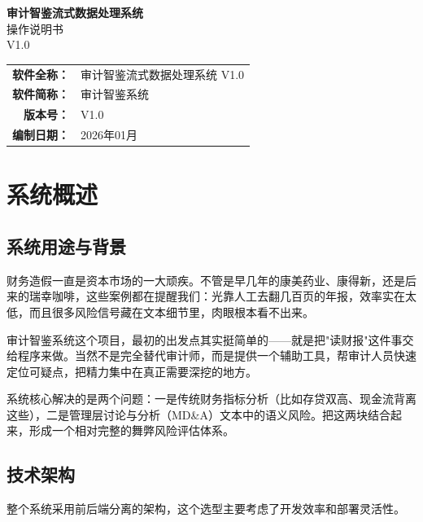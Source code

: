 \documentclass[12pt,a4paper]{ctexart}
\begin{document}
\begin{titlepage}
\centering
\vspace*{3cm}
{\Huge\heiti\bfseries 审计智鉴流式数据处理系统}\\[0.8cm]
{\LARGE\heiti 操作说明书}\\[0.5cm]
{\Large V1.0}\\[3cm]
\begin{tabular}{rl}
\textbf{软件全称：} & 审计智鉴流式数据处理系统 V1.0 \\[0.3em]
\textbf{软件简称：} & 审计智鉴系统 \\[0.3em]
\textbf{版本号：} & V1.0 \\[0.3em]
\textbf{编制日期：} & 2026年01月 \\
\end{tabular}
\vfill
\end{titlepage}

\tableofcontents
\newpage

\section{系统概述}

\subsection{系统用途与背景}

财务造假一直是资本市场的一大顽疾。不管是早几年的康美药业、康得新，还是后来的瑞幸咖啡，这些案例都在提醒我们：光靠人工去翻几百页的年报，效率实在太低，而且很多风险信号藏在文本细节里，肉眼根本看不出来。

审计智鉴系统这个项目，最初的出发点其实挺简单的——就是把"读财报"这件事交给程序来做。当然不是完全替代审计师，而是提供一个辅助工具，帮审计人员快速定位可疑点，把精力集中在真正需要深挖的地方。

系统核心解决的是两个问题：一是传统财务指标分析（比如存贷双高、现金流背离这些），二是管理层讨论与分析（MD\&A）文本中的语义风险。把这两块结合起来，形成一个相对完整的舞弊风险评估体系。

\subsection{技术架构}

整个系统采用前后端分离的架构，这个选型主要考虑了开发效率和部署灵活性。
\end{document}

